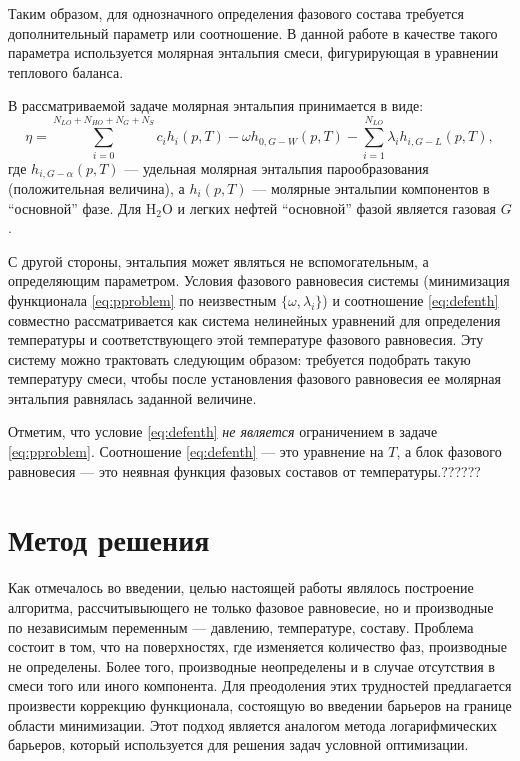 \documentclass[12pt]{article}
\begin{document}
Таким образом, для однозначного определения фазового состава требуется дополнительный параметр или соотношение. В данной работе в качестве такого параметра используется молярная энтальпия смеси, фигурирующая в уравнении теплового баланса.

В рассматриваемой задаче молярная энтальпия принимается в виде:
\begin{equation}
\eta = \sum_{i=0}^{N_{LO}+N_{HO}+N_{G}+N_{S}} c_i h_i(p,T) -\omega h_{0,G-W}(p,T) -\sum_{i=1}^{N_{LO}} \lambda_i
h_{i,G-L}(p,T) , \label{eq:defenth}
\end{equation}
где $h_{i,G-\alpha}(p,T)$ --- удельная молярная энтальпия парообразования (положительная величина), а $h_i(p,T)$ --- молярные энтальпии компонентов в ``основной'' фазе. Для $\mathrm{H_2O}$ и легких нефтей ``основной'' фазой является газовая $G$.

С другой стороны, энтальпия может являться не вспомогательным, а определяющим параметром. Условия фазового равновесия системы (минимизация функционала \eqref{eq:pproblem} по неизвестным $\{\omega, \lambda_i\}$) и соотношение \eqref{eq:defenth} совместно рассматривается как система нелинейных уравнений для определения температуры и соответствующего этой температуре фазового равновесия. Эту систему можно трактовать следующим образом: требуется подобрать такую температуру смеси, чтобы после установления фазового равновесия ее молярная энтальпия равнялась заданной величине.

Отметим, что условие \eqref{eq:defenth} \emph{не является} ограничением в задаче \eqref{eq:pproblem}. Соотношение \eqref{eq:defenth} --- это уравнение на $T$, а блок фазового равновесия --- это неявная функция фазовых составов от температуры.??????


\section{Метод решения}

Как отмечалось во введении, целью настоящей работы являлось построение алгоритма, рассчитывыющего не только фазовое равновесие, но и производные по независимым переменным --- давлению, температуре, составу. Проблема состоит в том, что на поверхностях, где изменяется количество фаз, производные не определены. Более того, производные неопределены и в случае отсутствия в смеси того или иного компонента. Для преодоления этих трудностей предлагается произвести коррекцию функционала, состоящую во введении барьеров на границе области минимизации. Этот подход является аналогом метода логарифмических барьеров, который используется для решения задач условной оптимизации.
\end{document}
